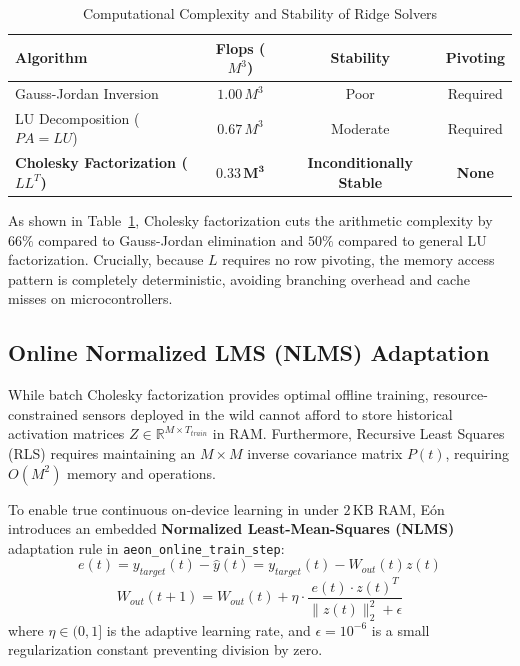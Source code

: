 \begin{table}[t]
\centering
\caption{Computational Complexity and Stability of Ridge Solvers}
\label{tab:solver_complexity}
\begin{tabular}{lccc}
\toprule
\textbf{Algorithm} & \textbf{Flops ($M^3$)} & \textbf{Stability} & \textbf{Pivoting} \\
\midrule
Gauss-Jordan Inversion & $1.00\, M^3$ & Poor & Required \\
LU Decomposition ($PA = LU$) & $0.67\, M^3$ & Moderate & Required \\
\textbf{Cholesky Factorization ($LL^T$)} & $\mathbf{0.33\, M^3}$ & \textbf{Inconditionally Stable} & \textbf{None} \\
\bottomrule
\end{tabular}
\end{table}

As shown in Table~\ref{tab:solver_complexity}, Cholesky factorization cuts the arithmetic complexity by $66\%$ compared to Gauss-Jordan elimination and $50\%$ compared to general LU factorization. Crucially, because $L$ requires no row pivoting, the memory access pattern is completely deterministic, avoiding branching overhead and cache misses on microcontrollers.

\subsection{Online Normalized LMS (NLMS) Adaptation}
While batch Cholesky factorization provides optimal offline training, resource-constrained sensors deployed in the wild cannot afford to store historical activation matrices $Z \in \mathbb{R}^{M \times T_{train}}$ in RAM. Furthermore, Recursive Least Squares (RLS) requires maintaining an $M \times M$ inverse covariance matrix $P(t)$, requiring $O(M^2)$ memory and operations.

To enable true continuous on-device learning in under $2\,\text{KB}$ RAM, Eón introduces an embedded \textbf{Normalized Least-Mean-Squares (NLMS)} adaptation rule in \texttt{aeon\_online\_train\_step}:
\begin{equation}
    e(t) = y_{target}(t) - \hat{y}(t) = y_{target}(t) - W_{out}(t) z(t)
\end{equation}
\begin{equation}
    W_{out}(t+1) = W_{out}(t) + \eta \cdot \frac{e(t) \cdot z(t)^T}{\|z(t)\|_2^2 + \epsilon}
    \label{eq:nlms}
\end{equation}
where $\eta \in (0, 1]$ is the adaptive learning rate, and $\epsilon = 10^{-6}$ is a small regularization constant preventing division by zero.
